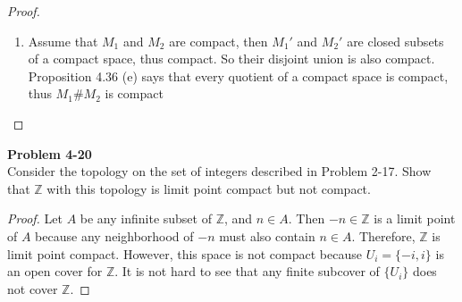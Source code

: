 \documentclass[12pt, a4paper]{article}
\theoremstyle{plain}
\newcommand{\Z}{\mathbb{Z}}
\newcommand{\mS}{\mathbb{S}}
\newenvironment{problem}[2][Problem]
    { \begin{mdframed}[backgroundcolor=gray!20] \textbf{#1 #2} \\}
    {  \end{mdframed}}
\begin{document}
\begin{proof}
\begin{enumerate}[label=(\alph*)]
            Assume otherwise, that is $g([0,1])\cap B_i=\varnothing$, we will show that $g([0,1])\cap \partial B_i \neq\varnothing$ by mathematical contradiction. If $g([0,1])\cap \partial B_i = \varnothing$, then $g^{-1}(B_i) = g^{-1}(\overline{B_i})$. Since $g$ is continuous, $g^{-1}(B_i)$ is clopen in $[0,1]$. But $g^{-1}(B_i)$ can't be empty by our assumption and can't be $[0,1]$ because $g(0)\not\in B_i$, we get a contradiction. 

            Ok, so $g([0,1])\cap \partial B_i \neq\varnothing$. Let $a = \inf\{t\in[0,1]\mid g(t)\in \partial B_i\}$ and $b=\sup\{t\in [0,1]\mid g(t)\in \partial B_i\}$. If $a=b$, it is not hard to see that $g([0,1])\cap U_i=\varnothing$, which is impossible. So $[a,b]$ is a subinterval of $[0,1]$. Notice that for $n>1$, the boundary of $B_i'$ is $\mS^n$ is path connected. So we can find a continuous function $h:[a,b]\to \partial B_i'$ that maps $a\mapsto g(a)$ and $b\mapsto g(b)$. Now we will define a function $k:[0,1]\mapsto M_i\setminus B_i$ as the following.
            \[
            k(t) = \begin{cases}
                g(t) \textrm{ if } t\in [0,a]\cup [b,1],\\
                h(t) \textrm{ if } t\in (a,b).
            \end{cases}
            \]
            It is not hard to see that (yes again, or else this proof would be super long) $k$ is a continuous map from $[0,1]\to M_i\setminus U_i$ such that $k(0)=g(0)=x$ and $k(1)=g(1)=y$. So $M_i\setminus U_i = M_i'$ is path connected. And this complete our proof.

            \item Assume that $M_1$ and $M_2$ are compact, then $M_1'$ and $M_2'$ are closed subsets of a compact space, thus compact. So their disjoint union is also compact. Proposition 4.36 (e) says that every quotient of a compact space is compact, thus $M_1\# M_2$ is compact
            
        \end{enumerate}
    \end{proof}

\begin{problem}{4-20}
    Consider the topology on the set of integers described in Problem 2-17. Show that $\Z$ with this topology is limit point compact but not compact.
\end{problem}
    \begin{proof}
        Let $A$ be any infinite subset of $\Z$, and $n\in A$. Then $-n\in \Z$ is a limit point of $A$ because any neighborhood of $-n$ must also contain $n\in A$. Therefore, $\Z$ is limit point compact. However, this space is not compact because $U_i=\{-i,i\}$ is an open cover for $\Z$. It is not hard to see that any finite subcover of $\{U_i\}$ does not cover $\Z$.
    \end{proof}
\end{document}
